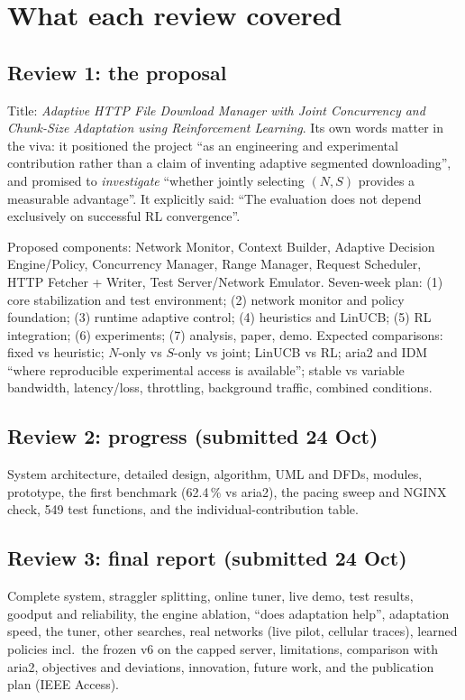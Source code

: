 \section{What each review covered}
\subsection{Review 1: the proposal}
Title: \emph{Adaptive HTTP File Download Manager with Joint Concurrency and Chunk-Size Adaptation using Reinforcement Learning}. Its own words matter in the viva: it positioned the project ``as an engineering and experimental contribution rather than a claim of inventing adaptive segmented downloading'', and promised to \emph{investigate} ``whether jointly selecting $(N, S)$ provides a measurable advantage''. It explicitly said: ``The evaluation does not depend exclusively on successful RL convergence''.

Proposed components: Network Monitor, Context Builder, Adaptive Decision Engine/Policy, Concurrency Manager, Range Manager, Request Scheduler, HTTP Fetcher + Writer, Test Server/Network Emulator. Seven-week plan: (1) core stabilization and test environment; (2) network monitor and policy foundation; (3) runtime adaptive control; (4) heuristics and LinUCB; (5) RL integration; (6) experiments; (7) analysis, paper, demo. Expected comparisons: fixed vs heuristic; $N$-only vs $S$-only vs joint; LinUCB vs RL; aria2 and IDM ``where reproducible experimental access is available''; stable vs variable bandwidth, latency/loss, throttling, background traffic, combined conditions.

\subsection{Review 2: progress (submitted 24 Oct)}
System architecture, detailed design, algorithm, UML and DFDs, modules, prototype, the first benchmark (62.4\,\% vs aria2), the pacing sweep and NGINX check, 549 test functions, and the individual-contribution table.

\subsection{Review 3: final report (submitted 24 Oct)}
Complete system, straggler splitting, online tuner, live demo, test results, goodput and reliability, the engine ablation, ``does adaptation help'', adaptation speed, the tuner, other searches, real networks (live pilot, cellular traces), learned policies incl.\ the frozen v6 on the capped server, limitations, comparison with aria2, objectives and deviations, innovation, future work, and the publication plan (IEEE Access).

